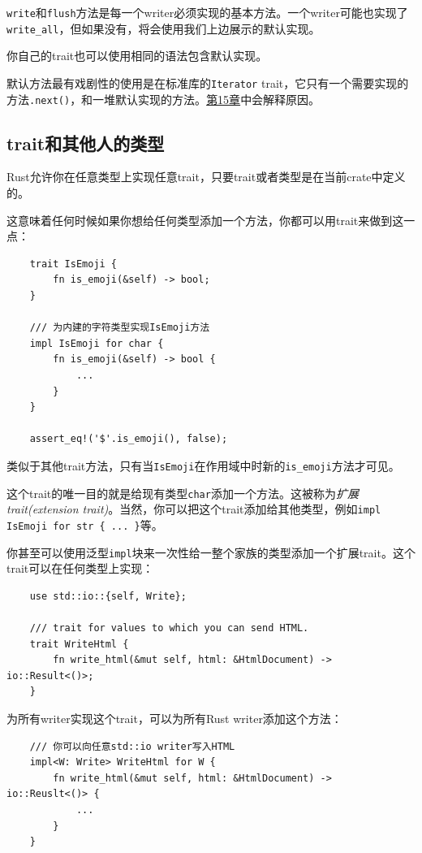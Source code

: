 \texttt{write}和\texttt{flush}方法是每一个writer必须实现的基本方法。一个writer可能也实现了\texttt{write\_all}，但如果没有，将会使用我们上边展示的默认实现。

你自己的trait也可以使用相同的语法包含默认实现。

默认方法最有戏剧性的使用是在标准库的\texttt{Iterator} trait，它只有一个需要实现的方法\texttt{.next()}，和一堆默认实现的方法。\hyperref[ch15]{第15章}中会解释原因。

\subsection{trait和其他人的类型}\label{OrphanRule}
Rust允许你在任意类型上实现任意trait，只要trait或者类型是在当前crate中定义的。

这意味着任何时候如果你想给任何类型添加一个方法，你都可以用trait来做到这一点：
\begin{verbatim}
    trait IsEmoji {
        fn is_emoji(&self) -> bool;
    }

    /// 为内建的字符类型实现IsEmoji方法
    impl IsEmoji for char {
        fn is_emoji(&self) -> bool {
            ...
        }
    }

    assert_eq!('$'.is_emoji(), false);
\end{verbatim}

类似于其他trait方法，只有当\texttt{IsEmoji}在作用域中时新的\texttt{is\_emoji}方法才可见。

这个trait的唯一目的就是给现有类型\texttt{char}添加一个方法。这被称为\emph{扩展trait(extension trait)}。当然，你可以把这个trait添加给其他类型，例如\texttt{impl IsEmoji for str \{ ... \}}等。

你甚至可以使用泛型\texttt{impl}块来一次性给一整个家族的类型添加一个扩展trait。这个trait可以在任何类型上实现：
\begin{verbatim}
    use std::io::{self, Write};

    /// trait for values to which you can send HTML.
    trait WriteHtml {
        fn write_html(&mut self, html: &HtmlDocument) -> io::Result<()>;
    }
\end{verbatim}

为所有writer实现这个trait，可以为所有Rust writer添加这个方法：
\begin{verbatim}
    /// 你可以向任意std::io writer写入HTML
    impl<W: Write> WriteHtml for W {
        fn write_html(&mut self, html: &HtmlDocument) -> io::Reuslt<()> {
            ...
        }
    }
\end{verbatim}

